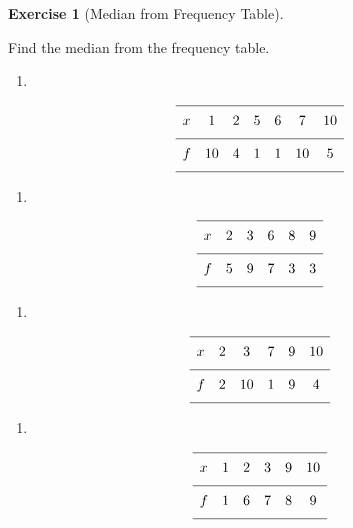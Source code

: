 \documentclass[
  letterpaper,
  DIV=11,
  numbers=noendperiod]{scrreprt}
\providecommand{\tightlist}{%
  \setlength{\itemsep}{0pt}\setlength{\parskip}{0pt}}
\theoremstyle{definition}
\newtheorem{exercise}{Exercise}[chapter]
\theoremstyle{remark}
\begin{document}
\begin{exercise}[Median from Frequency
Table]\protect\hypertarget{exr-freq-2}{}\label{exr-freq-2}

Find the median from the frequency table.

\begin{enumerate}
\def\labelenumi{\alph{enumi})}
\tightlist
\item
\end{enumerate}

\[{\renewcommand{\arraystretch}{1.6}\begin{array}{lcccccc}
\hline x & 1 & 2 & 5 & 6 & 7 & 10 \\[4pt]
\hline f & 10 & 4 & 1 & 1 & 10 & 5 \\[4pt]
\hline
\end{array}}\]

\begin{enumerate}
\def\labelenumi{\alph{enumi})}
\setcounter{enumi}{1}
\tightlist
\item
\end{enumerate}

\[{\renewcommand{\arraystretch}{1.6}\begin{array}{lccccc}
\hline x & 2 & 3 & 6 & 8 & 9 \\[4pt]
\hline f & 5 & 9 & 7 & 3 & 3 \\[4pt]
\hline
\end{array}}\]

\begin{enumerate}
\def\labelenumi{\alph{enumi})}
\setcounter{enumi}{2}
\tightlist
\item
\end{enumerate}

\[{\renewcommand{\arraystretch}{1.6}\begin{array}{lccccc}
\hline x & 2 & 3 & 7 & 9 & 10 \\[4pt]
\hline f & 2 & 10 & 1 & 9 & 4 \\[4pt]
\hline
\end{array}}\]

\begin{enumerate}
\def\labelenumi{\alph{enumi})}
\setcounter{enumi}{3}
\tightlist
\item
\end{enumerate}

\[{\renewcommand{\arraystretch}{1.6}\begin{array}{lccccc}
\hline x & 1 & 2 & 3 & 9 & 10 \\[4pt]
\hline f & 1 & 6 & 7 & 8 & 9 \\[4pt]
\hline
\end{array}}\]


\end{exercise}
\end{document}
